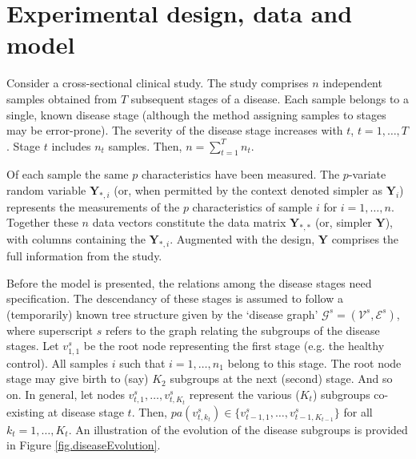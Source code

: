\documentclass[10pt]{article}
\begin{document}
\section{Experimental design, data and model}\label{sec:design}
Consider a cross-sectional clinical study. The study comprises $n$ independent samples obtained from $T$ subsequent stages of a disease. Each sample belongs to a single, known disease stage (although the method assigning samples to stages may be error-prone). The severity of the disease stage increases with $t$, $t=1, \ldots, T$. Stage $t$ includes $n_t$ samples. Then, $n = \sum_{t=1}^T n_t$.

Of each sample the same $p$ characteristics have been measured. The $p$-variate random variable $\mathbf{Y}_{\ast, i}$ (or, when permitted by the context denoted simpler as $\mathbf{Y}_i$) represents the measurements of the $p$ characteristics of sample $i$ for $i=1, \ldots, n$. Together these $n$ data vectors constitute the data matrix $\mathbf{Y}_{\ast, \ast}$ (or, simpler $\mathbf{Y}$), with columns containing the $\mathbf{Y}_{\ast, i}$. Augmented with the design, $\mathbf{Y}$ comprises the full information from the study.

Before the model is presented, the relations among the disease stages need specification. The descendancy of these stages is assumed to follow a (temporarily) known tree structure given by the `disease graph' $\mathcal{G}^s = (\mathcal{V}^s, \mathcal{E}^s)$, where superscript $s$ refers to the graph relating the subgroups of the disease stages. Let $v_{1,1}^s$ be the root node representing the first stage (e.g. the healthy control). All samples $i$ such that $i = 1, \ldots, n_1$ belong to this stage. The root node stage may give birth to (say) $K_2$ subgroups at the next (second) stage. And so on. In general, let nodes $v_{t,1}^s, \ldots, v_{t, K_t}^s$ represent the various ($K_t$) subgroups co-existing at disease stage $t$. Then, $pa(v_{t, k_t}^s) \in \{ v_{t-1, 1}^s, \ldots, v_{t-1, K_{t-1}}^s \}$ for all $k_t = 1, \ldots, K_t$. An illustration of the evolution of the disease subgroups is provided in Figure \ref{fig.diseaseEvolution}.
\end{document}
